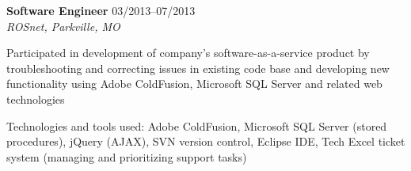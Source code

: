 \begin{itemize1}
	\item \textbf{Software Engineer} \textopenbullet{} 03/2013--07/2013 \\
		\textit{ROSnet, Parkville, MO} \vspace{-1.5mm}
		\begin{itemize1}
			\item Participated in development of company's software-as-a-service product by troubleshooting and correcting issues in existing code base and developing new functionality using Adobe ColdFusion, Microsoft SQL Server and related web technologies
			\item Technologies and tools used: Adobe ColdFusion, Microsoft SQL Server (stored procedures), jQuery (AJAX), SVN version control, Eclipse IDE, Tech Excel ticket system (managing and prioritizing support tasks)
		\end{itemize1}
\end{itemize1}

